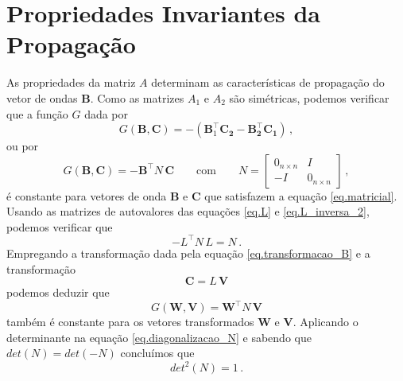\section{Propriedades Invariantes da Propaga\c{c}\~ao}
As propriedades da matriz $A$ determinam as caracter\'isticas de propaga\c{c}\~ao do vetor de ondas $\mathbf{B}$. Como as matrizes $A_1$ e $A_2$ s\~ao sim\'etricas, podemos verificar que a fun\c{c}\~ao $G$ dada por
\begin{equation}
G(\mathbf{B},\mathbf{C})=-(\mathbf{B}_1^\top\mathbf{C_2-\mathbf{B}_2^\top\mathbf{C}_1})\,,
\end{equation}
ou por
\begin{equation}
G(\mathbf{B},\mathbf{C})=-\mathbf{B}^\top N\,\mathbf{C}\qquad\text{com}\qquad N=
\begin{bmatrix}
0_{n\times n}&I\\
-I&0_{n\times n}
\end{bmatrix}\,,
\end{equation}
\'e constante para vetores de onda $\mathbf{B}$ e $\mathbf{C}$ que satisfazem a equa\c{c}\~ao \ref{eq.matricial}. Usando as matrizes de autovalores das equa\c{c}\~oes \ref{eq.L} e \ref{eq.L_inversa_2}, podemos verificar que
\begin{equation}\label{eq.diagonalizacao_N}
-L^\top N\,L=N\,.
\end{equation}
Empregando a transforma\c{c}\~ao dada pela equa\c{c}\~ao \ref{eq.transformacao_B} e a transforma\c{c}\~ao
\begin{equation}
\mathbf{C}=L\,\mathbf{V}
\end{equation}
podemos deduzir que 
\begin{equation}\label{eq.G(V,W)}
G(\mathbf{W},\mathbf{V})=\mathbf{W}^\top N\,\mathbf{V}
\end{equation}
tamb\'em \'e constante para os vetores transformados $\mathbf{W}$ e $\mathbf{V}$.
Aplicando o determinante na equa\c{c}\~ao \ref{eq.diagonalizacao_N} e sabendo que $det(N)=det(-N)$ conclu\'imos que
\begin{equation}
det^2(N)=1\,.
\end{equation}

